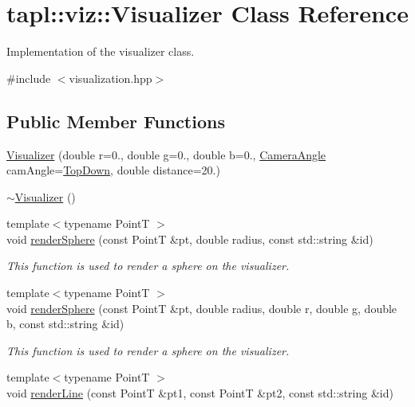 \hypertarget{classtapl_1_1viz_1_1Visualizer}{}\section{tapl\+:\+:viz\+:\+:Visualizer Class Reference}
\label{classtapl_1_1viz_1_1Visualizer}


Implementation of the visualizer class.  




{\ttfamily \#include $<$visualization.\+hpp$>$}

\subsection*{Public Member Functions}
\begin{DoxyCompactItemize}
\item 
\hyperlink{classtapl_1_1viz_1_1Visualizer_a43dc2c39814634258004d2d22a4be60d}{Visualizer} (double r=0., double g=0., double b=0., \hyperlink{namespacetapl_1_1viz_a99e496921984514dbc7bcef809f50150}{Camera\+Angle} cam\+Angle=\hyperlink{namespacetapl_1_1viz_a99e496921984514dbc7bcef809f50150a9aa35eea1fe8f4b45a0b02a8b5048cfa}{Top\+Down}, double distance=20.)
\item 
\hyperlink{classtapl_1_1viz_1_1Visualizer_a47473d1bffdf617379d718f1c2ed5930}{$\sim$\+Visualizer} ()
\item 
{\footnotesize template$<$typename PointT $>$ }\\void \hyperlink{classtapl_1_1viz_1_1Visualizer_ac65eafca7d0b3e61330822fa4cf30371}{render\+Sphere} (const PointT \&pt, double radius, const std\+::string \&id)
\begin{DoxyCompactList}\small\item\em This function is used to render a sphere on the visualizer. \end{DoxyCompactList}\item 
{\footnotesize template$<$typename PointT $>$ }\\void \hyperlink{classtapl_1_1viz_1_1Visualizer_ae3ae126d7fc42ebcbb258800c8682a9d}{render\+Sphere} (const PointT \&pt, double radius, double r, double g, double b, const std\+::string \&id)
\begin{DoxyCompactList}\small\item\em This function is used to render a sphere on the visualizer. \end{DoxyCompactList}\item 
{\footnotesize template$<$typename PointT $>$ }\\void \hyperlink{classtapl_1_1viz_1_1Visualizer_a44e1d90914fa8129f4e4a26b4ad67718}{render\+Line} (const PointT \&pt1, const PointT \&pt2, const std\+::string \&id)

\end{DoxyCompactItemize}
